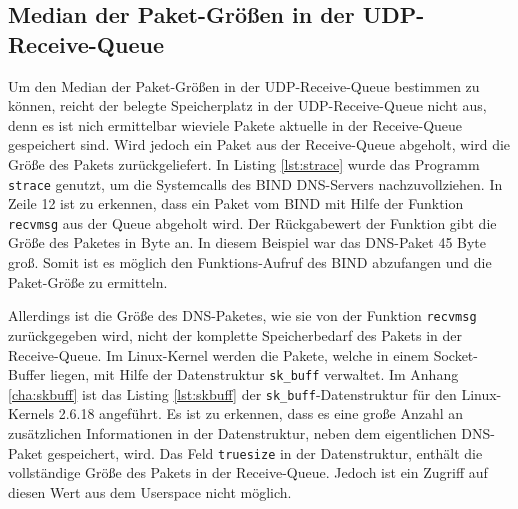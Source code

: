 \documentclass[a4paper, 12pt, BCOR10mm, DIV12, toc=bibliography, toc=listof, german]{scrbook}
\begin{document}

		\subsection*{Median der Paket-Größen in der UDP-Receive-Queue} %

		Um den Median der Paket-Größen in der UDP-Receive-Queue bestimmen zu können, reicht der belegte
		Speicherplatz in der UDP-Receive-Queue nicht aus, denn es ist nich ermittelbar wieviele Pakete
		aktuelle in der Receive-Queue gespeichert sind. Wird jedoch ein Paket aus der Receive-Queue
		abgeholt, wird die Größe des Pakets zurückgeliefert. In Listing \ref{lst:strace} wurde das
		Programm \texttt{strace} genutzt, um die Systemcalls des BIND DNS-Servers nachzuvollziehen. In
		Zeile 12 ist zu erkennen, dass ein Paket vom BIND mit Hilfe der Funktion \texttt{recvmsg} aus
		der Queue abgeholt wird. Der Rückgabewert der Funktion gibt die Größe des Paketes in Byte an. In
		diesem Beispiel war das DNS-Paket 45 Byte groß. Somit ist es möglich den Funktions-Aufruf des
		BIND abzufangen und die Paket-Größe zu ermitteln.

		Allerdings ist die Größe des DNS-Paketes, wie sie von der Funktion \texttt{recvmsg}
		zurückgegeben wird, nicht der komplette Speicherbedarf des Pakets in der Receive-Queue. Im
		Linux-Kernel werden die Pakete, welche in einem Socket-Buffer liegen, mit Hilfe der
		Datenstruktur \texttt{sk\_buff} verwaltet. Im Anhang \ref{cha:skbuff} ist das Listing
		\ref{lst:skbuff} der \texttt{sk\_buff}-Datenstruktur für den Linux-Kernels 2.6.18 angeführt. Es ist
		zu erkennen, dass es eine große Anzahl an zusätzlichen Informationen in der Datenstruktur, neben
		dem eigentlichen DNS-Paket gespeichert, wird. Das Feld \texttt{truesize} in der Datenstruktur,
		enthält die vollständige Größe des Pakets in der Receive-Queue. Jedoch ist ein Zugriff auf
		diesen Wert aus dem Userspace nicht möglich.
		
\end{document}
